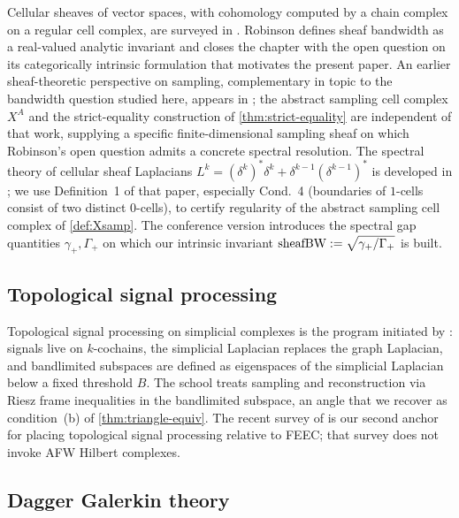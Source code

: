 Cellular sheaves of vector spaces, with cohomology computed by a
chain complex on a regular cell complex, are surveyed in
\cite[\S 6]{Robinson2014}. Robinson defines sheaf bandwidth as a
real-valued analytic invariant and closes the chapter with the open
question on its categorically intrinsic formulation that motivates
the present paper. An earlier sheaf-theoretic perspective on
sampling, complementary in topic to the bandwidth question studied
here, appears in \cite{Robinson2014Sampling}; the abstract sampling
cell complex $X^A$ and the strict-equality construction of
\cref{thm:strict-equality} are independent of that work, supplying a
specific finite-dimensional sampling sheaf on which Robinson's open
question admits a concrete spectral resolution. The spectral theory of cellular sheaf Laplacians
$L^k = (\delta^k)^* \delta^k + \delta^{k-1} (\delta^{k-1})^*$ is
developed in \cite{HansenGhrist2019}; we use Definition~1 of that
paper, especially Cond.~4 (boundaries of $1$-cells consist of two
distinct $0$-cells), to certify regularity of the abstract sampling
cell complex of \cref{def:Xsamp}. The conference
version \cite{HansenGhrist2019Allerton} introduces the spectral gap
quantities $\gamma_+, \Gamma_+$ on which our intrinsic invariant
$\operatorname{sheafBW} := \sqrt{\gamma_+/\Gamma_+}$ is built.

\subsection{Topological signal processing}\label{subsec:related-topsp}

Topological signal processing on simplicial complexes is the program
initiated by \cite{BarbarossaSardellitti2020}: signals live on
$k$-cochains, the simplicial Laplacian replaces the graph Laplacian,
and bandlimited subspaces are defined as eigenspaces of the
simplicial Laplacian below a fixed threshold $B$. The school treats
sampling and reconstruction via Riesz frame inequalities in the
bandlimited subspace, an angle that we recover as condition~(b) of
\cref{thm:triangle-equiv}. The recent survey of
\cite{CerejeirasKahlerLegatiuk2025} is our second anchor for
placing topological signal processing relative to FEEC; that survey
does not invoke AFW Hilbert complexes.

\subsection{Dagger Galerkin theory}\label{subsec:related-dagger}

